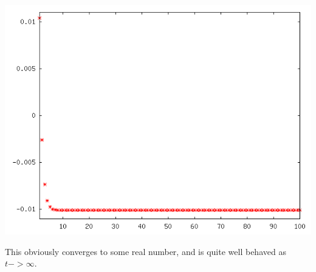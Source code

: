 \documentclass[11pt]{article}
\begin{document}
\begin{center}
\includegraphics[scale=0.5]{problem_19_19.png}
\end{center}

This obviously converges to some real number, and is quite well
behaved as $t -> \infty$.



%
\end{document}
